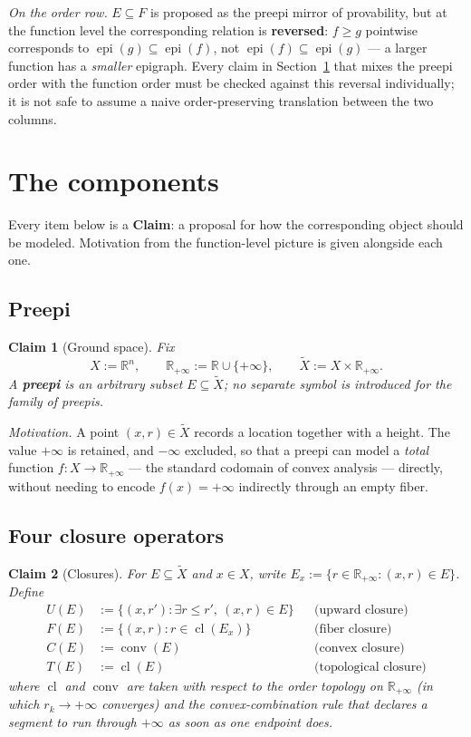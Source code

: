 \documentclass[11pt]{article}
\newtheorem{claim}{Claim}
\newcommand{\R}{\mathbb R}
\newcommand{\Rp}{\mathbb R_{+\infty}}
\newcommand{\epi}{\operatorname{epi}}
\newcommand{\cl}{\operatorname{cl}}
\newcommand{\conv}{\operatorname{conv}}
\begin{document}
\emph{On the order row.} $E\subseteq F$ is proposed as the preepi mirror of
provability, but at the function level the corresponding relation is
\textbf{reversed}: $f\ge g$ pointwise corresponds to $\epi(g)\subseteq\epi(f)$,
not $\epi(f)\subseteq\epi(g)$ — a larger function has a \emph{smaller}
epigraph. Every claim in Section~\ref{sec:components} that mixes the
preepi order with the function order must be checked against this reversal
individually; it is not safe to assume a naive order-preserving translation
between the two columns.

\section{The components}\label{sec:components}

Every item below is a \textbf{Claim}: a proposal for how the corresponding
object should be modeled. Motivation from the function-level picture is
given alongside each one.

\subsection{Preepi}

\begin{claim}[Ground space]
Fix
\[
X:=\R^n,\qquad \Rp:=\R\cup\{+\infty\},\qquad \tilde X:=X\times\Rp.
\]
A \textbf{preepi} is an arbitrary subset $E\subseteq\tilde X$; no separate
symbol is introduced for the family of preepis.
\end{claim}

\emph{Motivation.} A point $(x,r)\in\tilde X$ records a location together
with a height. The value $+\infty$ is retained, and $-\infty$ excluded, so
that a preepi can model a \emph{total} function $f:X\to\Rp$ — the standard
codomain of convex analysis — directly, without needing to encode
$f(x)=+\infty$ indirectly through an empty fiber.

\subsection{Four closure operators}

\begin{claim}[Closures]\label{cl:closures}
For $E\subseteq\tilde X$ and $x\in X$, write $E_x:=\{r\in\Rp:(x,r)\in E\}$.
Define
\begin{align*}
U(E) &:= \{(x,r'):\exists r\le r',\ (x,r)\in E\} &&\text{(upward closure)}\\
F(E) &:= \{(x,r): r\in\cl(E_x)\} &&\text{(fiber closure)}\\
C(E) &:= \conv(E) &&\text{(convex closure)}\\
T(E) &:= \cl(E) &&\text{(topological closure)}
\end{align*}
where $\cl$ and $\conv$ are taken with respect to the order topology on
$\Rp$ (in which $r_k\to+\infty$ converges) and the convex-combination rule
that declares a segment to run through $+\infty$ as soon as one endpoint
does.
\end{claim}
\end{document}

